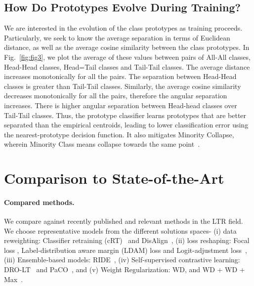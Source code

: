 \documentclass{article}
\begin{document}
\subsection{How Do Prototypes Evolve During Training?}
\label{Section6}
We are interested in the evolution of the class prototypes as training proceeds. Particularly, we seek to know the average separation in terms of Euclidean distance, as well as the average cosine similarity between the class prototypes. In Fig.~\ref{fig:fig3}, we plot the average of these values between pairs of All-All classes, Head-Head classes, Head=Tail classes and Tail-Tail classes. The average distance increases monotonically for all the pairs. The separation between Head-Head classes is greater than Tail-Tail classes. Similarly, the average cosine similarity decreases monotonically for all the pairs, therefore the angular separation increases. There is higher angular separation between Head-head classes over Tail-Tail classes. Thus, the prototype classifier learns prototypes that are better separated than the empirical centroids, leading to lower classification error using the nearest-prototype decision function. It also mitigates Minority Collapse, wherein Minority Class means collapse towards the same point~\cite{fang2021exploring}.

\section{Comparison to State-of-the-Art}
\paragraph{Compared methods.} We compare against recently published and relevant methods in the LTR field. We choose representative models from the different solutions spaces- (i) data reweighting: Classifier retraining (cRT)~\cite{kang2019decoupling} and DisAlign~\cite{zhang2021distribution}, (ii) loss reshaping: Focal loss \cite{lin2017focal}, Label-distribution aware margin (LDAM) loss \cite{cao2019learning} and Logit-adjustment loss~\cite{menon2020long}, (iii) Ensemble-based models: RIDE~\cite{wang2020long}, (iv) Self-supervised contrastive learning: DRO-LT~\cite{samuel2021distributional} and PaCO~\cite{cui2021parametric}, and (v) Weight Regularization: WD, and WD + WD + Max~\cite{alshammari2022long}. 
\end{document}
